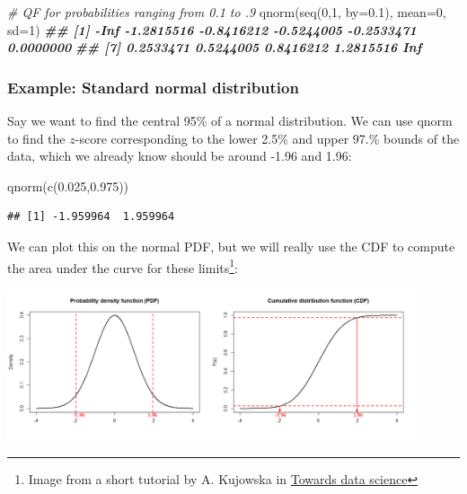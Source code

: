 \documentclass[
]{article}
\newenvironment{Shaded}{\begin{snugshade}}{\end{snugshade}}
\newcommand{\AttributeTok}[1]{\textcolor[rgb]{0.77,0.63,0.00}{#1}}
\newcommand{\CommentTok}[1]{\textcolor[rgb]{0.56,0.35,0.01}{\textit{#1}}}
\newcommand{\DecValTok}[1]{\textcolor[rgb]{0.00,0.00,0.81}{#1}}
\newcommand{\DocumentationTok}[1]{\textcolor[rgb]{0.56,0.35,0.01}{\textbf{\textit{#1}}}}
\newcommand{\FloatTok}[1]{\textcolor[rgb]{0.00,0.00,0.81}{#1}}
\newcommand{\FunctionTok}[1]{\textcolor[rgb]{0.00,0.00,0.00}{#1}}
\newcommand{\NormalTok}[1]{#1}
\begin{document}
\begin{Shaded}
\begin{Highlighting}[]

\CommentTok{\# QF for probabilities ranging from 0.1 to .9}
\FunctionTok{qnorm}\NormalTok{(}\FunctionTok{seq}\NormalTok{(}\DecValTok{0}\NormalTok{,}\DecValTok{1}\NormalTok{, }\AttributeTok{by=}\FloatTok{0.1}\NormalTok{), }\AttributeTok{mean=}\DecValTok{0}\NormalTok{, }\AttributeTok{sd=}\DecValTok{1}\NormalTok{)}
\DocumentationTok{\#\#  [1]       {-}Inf {-}1.2815516 {-}0.8416212 {-}0.5244005 {-}0.2533471  0.0000000}
\DocumentationTok{\#\#  [7]  0.2533471  0.5244005  0.8416212  1.2815516        Inf}
\end{Highlighting}
\end{Shaded}

\hypertarget{example-standard-normal-distribution}{%
\subsubsection{Example: Standard normal
distribution}\label{example-standard-normal-distribution}}

Say we want to find the central 95\% of a normal distribution. We can
use qnorm to find the \(z\)-score corresponding to the lower 2.5\% and
upper 97.\% bounds of the data, which we already know should be around
-1.96 and 1.96:

\begin{Shaded}
\begin{Highlighting}[]
\FunctionTok{qnorm}\NormalTok{(}\FunctionTok{c}\NormalTok{(}\FloatTok{0.025}\NormalTok{,}\FloatTok{0.975}\NormalTok{))}
\end{Highlighting}
\end{Shaded}

\begin{verbatim}
## [1] -1.959964  1.959964
\end{verbatim}

We can plot this on the normal PDF, but we will really use the CDF to
compute the area under the curve for these limits\footnote{Image from a
  short tutorial by A. Kujowska in
  \href{https://towardsdatascience.com/quantiles-key-to-probability-distributions-ce1786d479a9}{Towards
  data science}}:

\includegraphics[width=0.9\textwidth,height=\textheight]{Images/pdf_cdf_95pct_interval.png}
\end{document}

